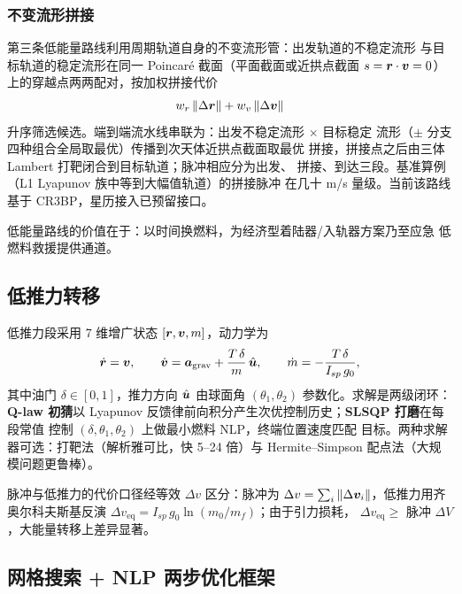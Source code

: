 \subsubsection{不变流形拼接}

第三条低能量路线利用周期轨道自身的不变流形管：出发轨道的不稳定流形
与目标轨道的稳定流形在同一 Poincaré 截面（平面截面或近拱点截面
$s = \bm{r} \cdot \bm{v} = 0$）上的穿越点两两配对，按加权拼接代价
\begin{equation}
  w_r \left\lVert \Delta \bm{r} \right\rVert + w_v \left\lVert \Delta \bm{v} \right\rVert
\end{equation}
升序筛选候选。端到端流水线串联为：出发不稳定流形 $\times$ 目标稳定
流形（$\pm$ 分支四种组合全局取最优）传播到次天体近拱点截面取最优
拼接，拼接点之后由三体 Lambert 打靶闭合到目标轨道；脉冲相应分为出发、
拼接、到达三段。基准算例（L1 Lyapunov 族中等到大幅值轨道）的拼接脉冲
在几十 m/s 量级。当前该路线基于 CR3BP，星历接入已预留接口。

低能量路线的价值在于：以时间换燃料，为经济型着陆器/入轨器方案乃至应急
低燃料救援提供通道。

\subsection{低推力转移}

低推力段采用 7 维增广状态 $[\bm{r}, \bm{v}, m]$，动力学为
\begin{equation}
  \dot{\bm{r}} = \bm{v}, \qquad
  \dot{\bm{v}} = \bm{a}_{\mathrm{grav}} + \frac{T\,\delta}{m}\,\hat{\bm{u}}, \qquad
  \dot m = -\frac{T\,\delta}{I_{sp}\, g_0},
\end{equation}
其中油门 $\delta \in [0,1]$，推力方向 $\hat{\bm{u}}$ 由球面角
$(\theta_1, \theta_2)$ 参数化。求解是两级闭环：\textbf{Q-law 初猜}以
Lyapunov 反馈律前向积分产生次优控制历史；\textbf{SLSQP 打磨}在每段常值
控制 $(\delta, \theta_1, \theta_2)$ 上做最小燃料 NLP，终端位置速度匹配
目标。两种求解器可选：打靶法（解析雅可比，快 5--24 倍）与
Hermite--Simpson 配点法（大规模问题更鲁棒）。

脉冲与低推力的代价口径经等效 $\Delta v$ 区分：脉冲为
$\Delta v = \sum_i \left\lVert \Delta \bm{v}_i \right\rVert$，低推力用齐奥尔科夫斯基反演
$\Delta v_{\mathrm{eq}} = I_{sp}\, g_0 \ln(m_0/m_f)$；由于引力损耗，
$\Delta v_{\mathrm{eq}} \ge$ 脉冲 $\Delta V$，大能量转移上差异显著。

\subsection{网格搜索 + NLP 两步优化框架}

